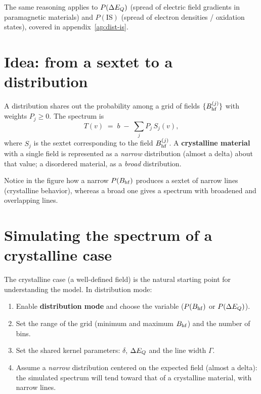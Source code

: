 The same reasoning applies to $P(\Delta E_{Q})$ (spread of electric field gradients in
paramagnetic materials) and $P(\mathrm{IS})$ (spread of electron densities /
oxidation states), covered in appendix~\ref{ap:dist-is}.

\section{Idea: from a sextet to a distribution}

A distribution shares out the probability among a grid of fields
$\{B_{\mathrm{hf}}^{(j)}\}$ with weights $P_j \ge 0$. The spectrum is
\[
  T(v) \;=\; b \;-\; \sum_j P_j \, S_j(v),
\]
where $S_j$ is the sextet corresponding to the field $B_{\mathrm{hf}}^{(j)}$. A
\textbf{crystalline material} with a single field is represented as a \emph{narrow}
distribution (almost a delta) about that value; a disordered material, as a
\emph{broad} distribution.


Notice in the figure how a narrow $P(B_{\mathrm{hf}})$ produces a sextet of narrow lines
(crystalline behavior), whereas a broad one gives a spectrum with broadened and
overlapping lines.

\section{Simulating the spectrum of a crystalline case}
\label{sec:sim-cristalina}

The crystalline case (a well-defined field) is the natural starting point for
understanding the model. In distribution mode:

\begin{enumerate}[nosep]
  \item Enable \textbf{distribution mode} and choose the variable ($P(B_{\mathrm{hf}})$ or
        $P(\Delta E_{Q})$).
  \item Set the range of the grid (minimum and maximum $B_{\mathrm{hf}}$) and the number of
        bins.
  \item Set the shared kernel parameters: $\delta$, $\Delta E_{Q}$ and the line width
        $\Gamma$.
  \item Assume a \emph{narrow} distribution centered on the expected field (almost
        a delta): the simulated spectrum will tend toward that of a crystalline
        material, with narrow lines.
\end{enumerate}

